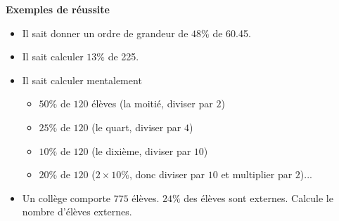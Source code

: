 \documentclass[10pt]{article}
\newcommand{\LR}{\begin{tikzpicture} \draw[Carmin,fill=Carmin] (0.05,0) -- (0,0.075) -- (-0.05,0) -- (0,-0.075) --cycle; \end{tikzpicture}}
\newenvironment{exemplesreussite}{%
    \renewcommand{\labelitemi}{\LR}%
    \renewcommand{\labelitemii}{-}%
    \color{black}%
    \par\textbf{Exemples de réussite}
    \begin{itemize}
    \setlength{\itemsep}{-0.2em}%
}{
    \end{itemize}
}
\newenvironment{sousitemize}{
    \color{black}%
    \vspace{-1em}%
    \begin{itemize}
    \setlength{\itemsep}{0em}%
}{
    \end{itemize}
}
\begin{document}
\begin{exemplesreussite}
\begin{center}
\begin{tabularx}{0.5\textwidth}{|X|c|}
        \end{tabularx}
        \end{center}
        \item Il sait donner un ordre de grandeur de $48 \%$ de \qty{60,45}{\EURO}.
        \item Il sait calculer $13 \%$ de \qty{225}{\EURO}.
        \item Il sait calculer mentalement
        \begin{sousitemize}
            \item $50 \%$ de $120$ élèves (la moitié, diviser par $2$)
            \item $25 \%$ de $120$ (le quart, diviser par $4$)
            \item $10 \%$ de $120$ (le dixième, diviser par $10$)
            \item $20 \%$ de $120$ ($2 \times 10 \%$, donc diviser par $10$ et multiplier par $2$)...
        \end{sousitemize}
        \item Un collège comporte $775$ élèves. $24 \%$ des élèves sont externes. Calcule le nombre d’élèves externes.

    \end{exemplesreussite}
    
\end{document}
